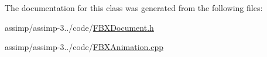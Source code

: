 The documentation for this class was generated from the following files\+:\begin{DoxyCompactItemize}
\item 
assimp/assimp-\/3../code/\hyperlink{_f_b_x_document_8h}{F\+B\+X\+Document.\+h}\item 
assimp/assimp-\/3../code/\hyperlink{_f_b_x_animation_8cpp}{F\+B\+X\+Animation.\+cpp}\end{DoxyCompactItemize}
